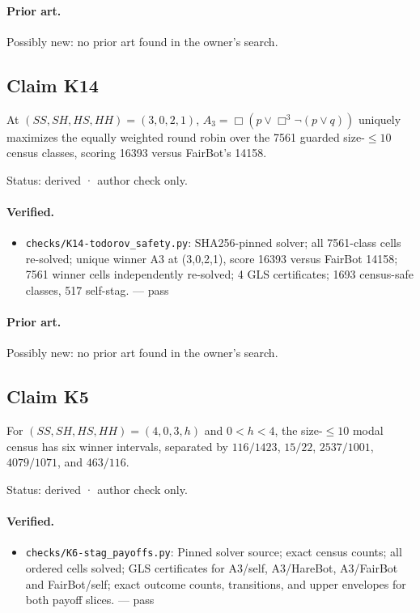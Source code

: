 \documentclass{article}
\begin{document}
\paragraph{Prior art.} Possibly new: no prior art found in the owner's search.

\subsection*{Claim K14}

At $(SS,SH,HS,HH)=(3,0,2,1)$, $A_3=\Box(p\lor\Box^3\neg(p\lor q))$ uniquely maximizes the equally weighted round robin over the 7561 guarded size-$\le10$ census classes, scoring 16393 versus FairBot's 14158.

Status: derived · author check only.

\paragraph{Verified.}
\begin{itemize}
\item \texttt{checks/K14-todorov\_safety.py}: SHA256-pinned solver; all 7561-class cells re-solved; unique winner A3 at (3,0,2,1), score 16393 versus FairBot 14158; 7561 winner cells independently re-solved; 4 GLS certificates; 1693 census-safe classes, 517 self-stag. --- pass
\end{itemize}

\paragraph{Prior art.} Possibly new: no prior art found in the owner's search.

\subsection*{Claim K5}

For $(SS,SH,HS,HH)=(4,0,3,h)$ and $0<h<4$, the size-$\le10$ modal census has six winner intervals, separated by $116/1423$, $15/22$, $2537/1001$, $4079/1071$, and $463/116$.

Status: derived · author check only.

\paragraph{Verified.}
\begin{itemize}
\item \texttt{checks/K6-stag\_payoffs.py}: Pinned solver source; exact census counts; all ordered cells solved; GLS certificates for A3/self, A3/HareBot, A3/FairBot and FairBot/self; exact outcome counts, transitions, and upper envelopes for both payoff slices. --- pass
\end{itemize}
\end{document}

